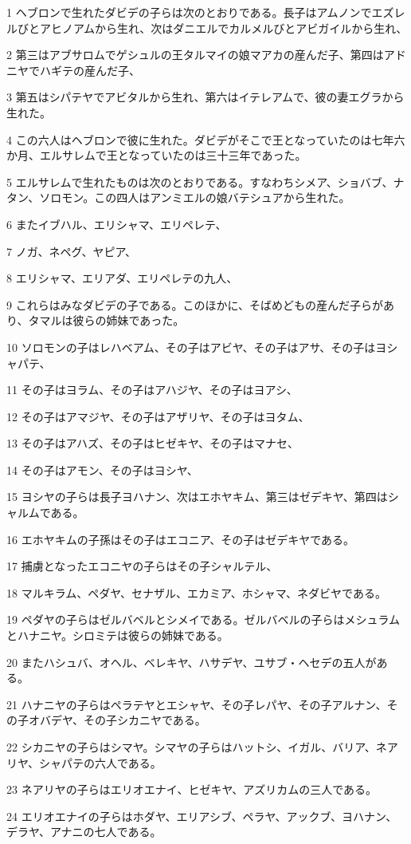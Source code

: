 \par 1 ヘブロンで生れたダビデの子らは次のとおりである。長子はアムノンでエズレルびとアヒノアムから生れ、次はダニエルでカルメルびとアビガイルから生れ、
\par 2 第三はアブサロムでゲシュルの王タルマイの娘マアカの産んだ子、第四はアドニヤでハギテの産んだ子、
\par 3 第五はシパテヤでアビタルから生れ、第六はイテレアムで、彼の妻エグラから生れた。
\par 4 この六人はヘブロンで彼に生れた。ダビデがそこで王となっていたのは七年六か月、エルサレムで王となっていたのは三十三年であった。
\par 5 エルサレムで生れたものは次のとおりである。すなわちシメア、ショバブ、ナタン、ソロモン。この四人はアンミエルの娘バテシュアから生れた。
\par 6 またイブハル、エリシャマ、エリペレテ、
\par 7 ノガ、ネペグ、ヤピア、
\par 8 エリシャマ、エリアダ、エリペレテの九人、
\par 9 これらはみなダビデの子である。このほかに、そばめどもの産んだ子らがあり、タマルは彼らの姉妹であった。
\par 10 ソロモンの子はレハベアム、その子はアビヤ、その子はアサ、その子はヨシャパテ、
\par 11 その子はヨラム、その子はアハジヤ、その子はヨアシ、
\par 12 その子はアマジヤ、その子はアザリヤ、その子はヨタム、
\par 13 その子はアハズ、その子はヒゼキヤ、その子はマナセ、
\par 14 その子はアモン、その子はヨシヤ、
\par 15 ヨシヤの子らは長子ヨハナン、次はエホヤキム、第三はゼデキヤ、第四はシャルムである。
\par 16 エホヤキムの子孫はその子はエコニア、その子はゼデキヤである。
\par 17 捕虜となったエコニヤの子らはその子シャルテル、
\par 18 マルキラム、ペダヤ、セナザル、エカミア、ホシャマ、ネダビヤである。
\par 19 ペダヤの子らはゼルバベルとシメイである。ゼルバベルの子らはメシュラムとハナニヤ。シロミテは彼らの姉妹である。
\par 20 またハシュバ、オヘル、ベレキヤ、ハサデヤ、ユサブ・ヘセデの五人がある。
\par 21 ハナニヤの子らはペラテヤとエシャヤ、その子レパヤ、その子アルナン、その子オバデヤ、その子シカニヤである。
\par 22 シカニヤの子らはシマヤ。シマヤの子らはハットシ、イガル、バリア、ネアリヤ、シャパテの六人である。
\par 23 ネアリヤの子らはエリオエナイ、ヒゼキヤ、アズリカムの三人である。
\par 24 エリオエナイの子らはホダヤ、エリアシブ、ペラヤ、アックブ、ヨハナン、デラヤ、アナニの七人である。

